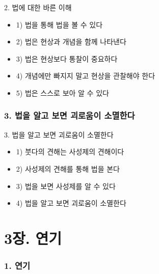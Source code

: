 \documentclass[aspectratio=1610,14pt,xcolor=pdftex,dvipsnames,table,handout]{beamer}
\begin{document}
		\begin{frame} [t,plain]
			\begin{block} {2. 법에 대한 바른 이해}
			\begin{itemize}
				\item 1) 법을 통해 법을 볼 수 있다
				\item 2) 법은 현상과 개념을 함께 나타낸다
				\item 3) 법은 현상보다 통찰이 중요하다
				\item 4) 개념에만 빠지지 말고 현상을 관찰해야 한다
				\item 5) 법은 스스로 보아 알 수 있다
			\end{itemize}
			\end{block}
		\end{frame}

		\section{3. 법을 알고 보면 괴로움이 소멸한다}
		\frame [plain] {\sectionpage}

		\begin{frame} [t,plain]
			\begin{block} {3. 법을 알고 보면 괴로움이 소멸한다}
			\begin{itemize}
				\item 1) 붓다의 견해는 사성제의 견해이다
				\item 2) 사성제의 견해를 통해 법을 본다
				\item 3) 법을 보면 사성제를 알 수 있다
				\item 4) 법을 알고 보면 괴로움이 소멸한다
			\end{itemize}
			\end{block}
		\end{frame}


		\part{3장. 연기}
		\frame{\partpage}


		\section{1. 연기}
		\frame [plain] {\sectionpage}
\end{document}
